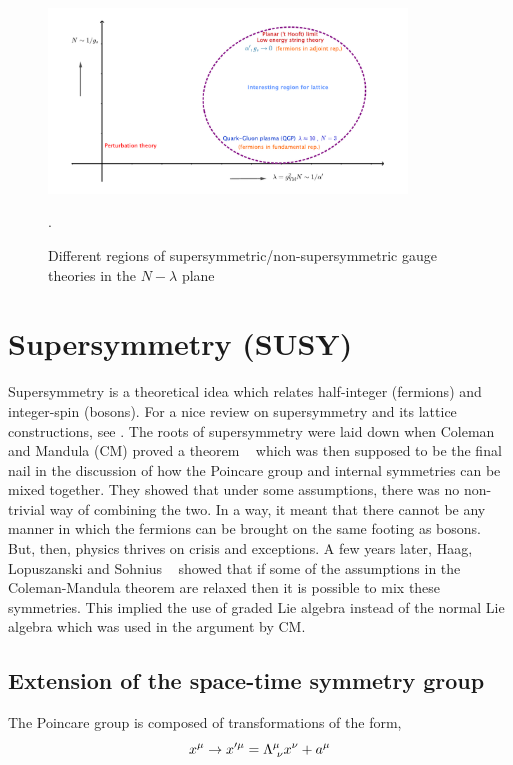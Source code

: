 \begin{figure}
\begin{center}\includegraphics[width=0.85\textwidth]{./Figures/N_lam_phase.pdf}\end{center}
\caption{\label{fig:Nlam1}Different regions of supersymmetric/non-supersymmetric gauge theories in the $N-\lambda$ plane}. 
\end{figure}

\section{Supersymmetry (SUSY)}

Supersymmetry is a theoretical idea which relates half-integer (fermions) and
integer-spin (bosons). For a nice review on supersymmetry and its lattice constructions, 
see \cite{Argyres:2001eva, Seiberg:1997ax, Catterall:2009it}. 
The roots of supersymmetry were laid down when Coleman and Mandula (CM) proved a theorem ~\cite{Coleman:1967ad} 
which was then supposed to be the final nail in the discussion of how the Poincare group and internal symmetries can 
be mixed together. 
They showed that under some assumptions, there was no non-trivial way of combining the two. In a way, it meant that 
there cannot be any manner in which the fermions can be brought on the same footing as bosons. But, then, physics 
thrives on crisis and exceptions. A few years later, Haag, Lopuszanski and Sohnius ~\cite{Haag:1974qh} showed that 
if some of the assumptions in the Coleman-Mandula theorem are relaxed then it is possible to mix these symmetries. 
This implied the use of graded Lie algebra instead of the normal Lie algebra which was used in the argument by CM.  

\subsection{Extension of the space-time symmetry group} 
The Poincare group is composed of transformations of the form, 
\begin{equation}
x^{\mu} \rightarrow x^{\prime \mu} = \Lambda^{\mu}_{\hspace{1mm} \nu} x^{\nu} + a^{\mu}
\end{equation}

